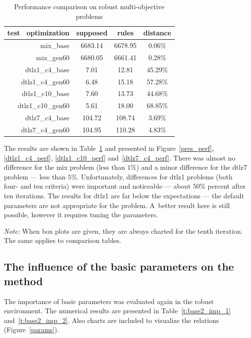 \begin{table}
  \centering
  \begin{tabular}{r c c c}
    \hline
    test \ optimization & supposed & rules & distance \\
    \hline
    \hline
    mix\_base & 6683.14 & 6678.95 & 0.06\% \\
    mix\_gen60 & 6680.05 & 6661.41 & 0.28\% \\
    dtlz1\_c4\_base & 7.01 & 12.81 & 45.29\% \\
    dtlz1\_c4\_gen60 & 6.48 & 15.18 & 57.28\% \\
    dtlz1\_c10\_base & 7.60 & 13.73 & 44.68\% \\
    dtlz1\_c10\_gen60 & 5.61 & 18.00 & 68.85\% \\
    dtlz7\_c4\_base & 104.72 & 108.74 & 3.69\% \\
    dtlz7\_c4\_gen60 & 104.95 & 110.28 & 4.83\% \\
    \hline
  \end{tabular}
  \caption{Performance comparison on robust multi-objective problems}
  \label{t:perf-comp}
\end{table}

The results are shown in Table~\ref{t:perf-comp} and presented in
Figure~\ref{pres_perf}, \ref{dtlz1_c4_perf}, \ref{dtlz1_c10_perf}
and~\ref{dtlz7_c4_perf}. There was almost no difference for the mix problem
(less than $1\%$) and a minor difference for the dtlz7 problem --- less than
$5\%$. Unfortunately, differences for dtlz1 problems (both four- and ten
criteria) were important and noticeable --- about $50\%$ percent after ten
iterations. The results for dtlz1 are far below the expectations --- the
default parameters are not appropriate for the problem. A~better result here
is still possible, however it requires tuning the parameters.

\textit{Note:} When box plots are given, they are always charted for the tenth
iteration. The same applies to comparison tables.

 \clearpage{}

\subsection{The influence of the basic parameters on the method}

The importance of basic parameters was evaluated again in the robust
environment. The numerical results are presented in Table~\ref{t:base2_imp_1}
and~\ref{t:base2_imp_2}. Also charts are included to visualize the relations
(Figure~\ref{params}).

